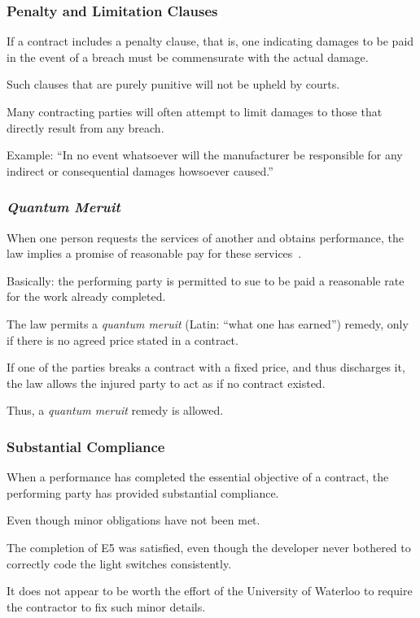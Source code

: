 \begin{frame}
\frametitle{Penalty and Limitation Clauses}

If a contract includes a \alert{penalty clause}, that is, one indicating damages to be paid in the event of a breach must be commensurate with the actual damage.

Such clauses that are purely punitive will not be upheld by courts.

Many contracting parties will often attempt to limit damages to those that directly result from any breach.

Example: ``In no event whatsoever will the manufacturer be responsible for any indirect or consequential damages howsoever caused.''

\end{frame}



\begin{frame}
\frametitle{\textit{Quantum Meruit}}

When one person requests the services of another and obtains performance, the law implies a promise of reasonable pay for these services~\cite{lba}.

Basically: the performing party is permitted to sue to be paid a reasonable rate for the work already completed.

The law permits a \textit{quantum meruit} (Latin: ``what one has earned'') remedy, only if there is no agreed price stated in a contract.

If one of the parties breaks a contract with a fixed price, and thus discharges it, the law allows the injured party to act as if no contract existed.

Thus, a \textit{quantum meruit} remedy is allowed.

\end{frame}



\begin{frame}
\frametitle{Substantial Compliance}

When a performance has completed the essential objective of a contract, the performing party has provided \alert{substantial compliance}.

Even though minor obligations have not been met.

The completion of E5 was satisfied, even though the developer never bothered to correctly code the light switches consistently.

It does not appear to be worth the effort of the University of Waterloo to require the contractor to fix such minor details.

\end{frame}



